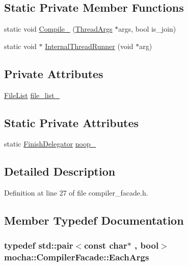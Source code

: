 \subsection*{Static Private Member Functions}
\begin{DoxyCompactItemize}
\item 
static void \hyperlink{classmocha_1_1_compiler_facade_a3a651f32d0a30fc37c390cdb3e1a261f}{Compile\_\-} (\hyperlink{structmocha_1_1_thread_args}{ThreadArgs} $\ast$args, bool is\_\-join)
\item 
static void $\ast$ \hyperlink{classmocha_1_1_compiler_facade_a4ea17472d3706ab44eeea4c92d007469}{InternalThreadRunner} (void $\ast$arg)
\end{DoxyCompactItemize}
\subsection*{Private Attributes}
\begin{DoxyCompactItemize}
\item 
\hyperlink{classmocha_1_1_compiler_facade_a8b5aaa05b5213622382bbd292a460461}{FileList} \hyperlink{classmocha_1_1_compiler_facade_a8d2f57f1ddf6c9e78e54853f1febc705}{file\_\-list\_\-}
\end{DoxyCompactItemize}
\subsection*{Static Private Attributes}
\begin{DoxyCompactItemize}
\item 
static \hyperlink{classmocha_1_1_finish_delegator}{FinishDelegator} \hyperlink{classmocha_1_1_compiler_facade_a4f09a3d142a4d54ab478b7742f723226}{noop\_\-}
\end{DoxyCompactItemize}


\subsection{Detailed Description}


Definition at line 27 of file compiler\_\-facade.h.



\subsection{Member Typedef Documentation}
\hypertarget{classmocha_1_1_compiler_facade_a22a27bcd738fd453a4da03982f96a080}{
\subsubsection[{EachArgs}]{\setlength{\rightskip}{0pt plus 5cm}typedef std::pair$<$const char$\ast$ , bool$>$ {\bf mocha::CompilerFacade::EachArgs}}}
\label{classmocha_1_1_compiler_facade_a22a27bcd738fd453a4da03982f96a080}


